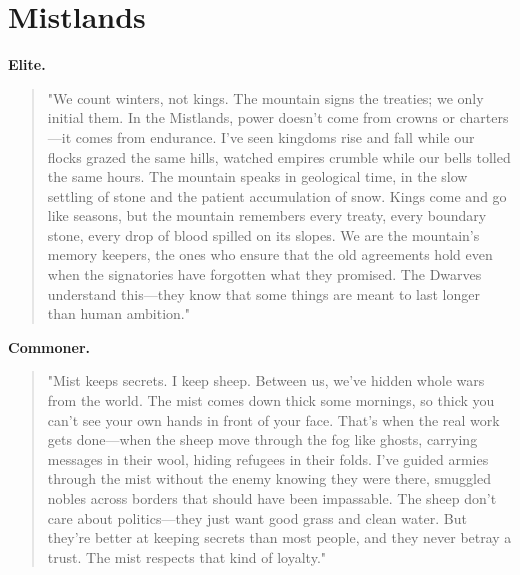 \section*{Mistlands}
\textbf{Elite.}
\begin{quote}
"We count winters, not kings. The mountain signs the treaties; we only initial them. In the Mistlands, power doesn't come from crowns or charters—it comes from endurance. I've seen kingdoms rise and fall while our flocks grazed the same hills, watched empires crumble while our bells tolled the same hours. The mountain speaks in geological time, in the slow settling of stone and the patient accumulation of snow. Kings come and go like seasons, but the mountain remembers every treaty, every boundary stone, every drop of blood spilled on its slopes. We are the mountain's memory keepers, the ones who ensure that the old agreements hold even when the signatories have forgotten what they promised. The Dwarves understand this—they know that some things are meant to last longer than human ambition."
\end{quote}
\textbf{Commoner.}
\begin{quote}
"Mist keeps secrets. I keep sheep. Between us, we've hidden whole wars from the world. The mist comes down thick some mornings, so thick you can't see your own hands in front of your face. That's when the real work gets done—when the sheep move through the fog like ghosts, carrying messages in their wool, hiding refugees in their folds. I've guided armies through the mist without the enemy knowing they were there, smuggled nobles across borders that should have been impassable. The sheep don't care about politics—they just want good grass and clean water. But they're better at keeping secrets than most people, and they never betray a trust. The mist respects that kind of loyalty."
\end{quote}

